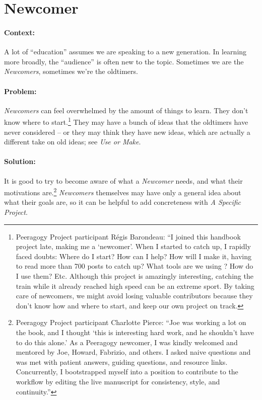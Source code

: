 \section{Newcomer}
\paragraph{Context:}
A lot of ``education'' assumes we are speaking to a new generation. 
In learning more broadly, the ``audience'' is often new to the topic.
Sometimes we are the \emph{Newcomers}, sometimes we're the oldtimers.

\paragraph{Problem:} \emph{Newcomers} can feel overwhelmed by the amount of things to learn.  They
don't know where to start.\footnote{Peeragogy Project participant
R\'egis Barondeau: ``I joined this handbook project late, making me
a `newcomer'. When I started to catch up, I rapidly faced doubts:
Where do I start? How can I help? How will I make it, having to read
more than 700 posts to catch up? What tools are we using ? How do I use
them? Etc. Although this project is amazingly interesting, catching the
train while it already reached high speed can be an extreme sport. By
taking care of newcomers, we might avoid losing valuable contributors
because they don't know how and where to start, and keep our own project
on track.}  They may have a bunch of ideas that the oldtimers have
never considered -- or they may think they have new ideas, which are actually
a different take on old ideas; see \emph{Use or Make}.

\paragraph{Solution:} It is good to try to become aware of what a \emph{Newcomer}
needs, and what their motivations are.\footnote{Peeragogy Project participant
Charlotte Pierce: ``Joe was working a lot on the book, and I thought
`this is interesting hard work, and he shouldn't have to do
this alone.' As a Peeragogy newcomer, I was kindly welcomed and
mentored by Joe, Howard, Fabrizio, and others. I asked naive questions
and was met with patient answers, guiding questions, and resource links.
Concurrently, I bootstrapped myself into a position to contribute to the
workflow by editing the live manuscript for consistency, style, and continuity.''}
\emph{Newcomers} themselves may have only a general idea about what their goals are, so it can be
helpful to add concreteness with \emph{A Specific Project}.


